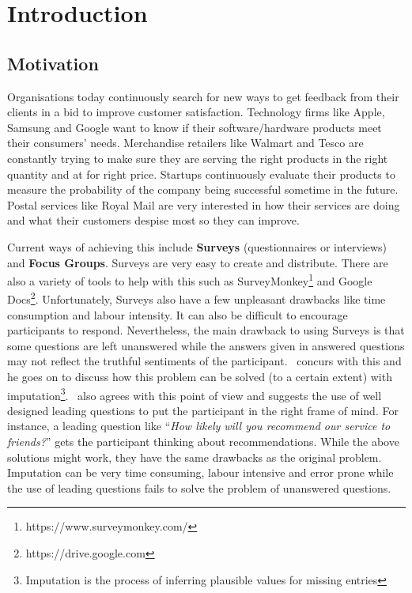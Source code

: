 
\chapter{Introduction}
\label{cha:introduction}

\section{Motivation}
\label{sec:motivation}
Organisations today continuously search for new ways to get feedback from their clients in a bid to
improve customer satisfaction. Technology firms like Apple, Samsung and Google want to know if their
software/hardware products meet their consumers' needs. Merchandise retailers like Walmart and Tesco
are constantly trying to make sure they are serving the right products in the right quantity and at
for right price. Startups continuously evaluate their products to measure the probability of the
company being successful sometime in the future. Postal services like Royal Mail are very interested
in how their services are doing and what their customers despise most so they can improve.

Current ways of achieving this include \textbf{Surveys} (questionnaires or interviews) and
\textbf{Focus Groups}.  Surveys are very easy to create and distribute. There are also a variety of
tools to help with this such as SurveyMonkey\footnote{https://www.surveymonkey.com/} and Google
Docs\footnote{https://drive.google.com}. Unfortunately, Surveys also have a few unpleasant drawbacks
like time consumption and labour intensity. It can also be difficult to encourage participants to
respond. Nevertheless, the main drawback to using Surveys is that some questions are left unanswered
while the answers given in answered questions may not reflect the truthful sentiments of the
participant.~\citet{rubin1987} concurs with this and he goes on to discuss how this problem can be
solved (to a certain extent) with imputation\footnote{Imputation is the process of inferring
plausible values for missing entries}.~\citet{hayes2008} also agrees with this point of view and
suggests the use of well designed leading questions to put the participant in the right frame of
mind. For instance, a leading question like ``\textit{How likely will you recommend our service to
friends?}'' gets the participant thinking about recommendations. While the above solutions might
work, they have the same drawbacks as the original problem. Imputation can be very time consuming,
labour intensive and error prone while the use of leading questions fails to solve the problem of
unanswered questions.

